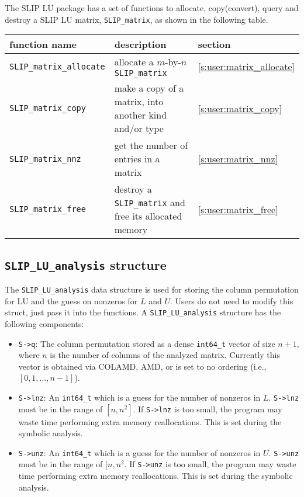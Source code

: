 \documentclass[12pt]{article}
\theoremstyle{definition}
\begin{document}
The SLIP LU package has a set of functions to allocate, copy(convert), query and
destroy a SLIP LU matrix, \verb|SLIP_matrix|, as shown in the following table.

{\small
\begin{center}
\begin{tabular}{lp{2.5in}l}
\hline
function name & description & section \\
\hline
\verb|SLIP_matrix_allocate|
    & allocate a $m$-by-$n$ \verb|SLIP_matrix|
    & \ref{s:user:matrix_allocate} \\
\hline
\verb|SLIP_matrix_copy|
    & make a copy of a matrix, into another kind and/or type
    & \ref{s:user:matrix_copy} \\
\hline
\verb|SLIP_matrix_nnz|
    & get the number of entries in a matrix
    & \ref{s:user:matrix_nnz} \\
\hline
\verb|SLIP_matrix_free|
    & destroy a \verb|SLIP_matrix| and free its allocated memory
    & \ref{s:user:matrix_free} \\
\hline
\end{tabular}
\end{center}
}


\cprotect\subsection{\verb|SLIP_LU_analysis| structure}
\label{ss:SLIP_LU_analysis}

The \verb|SLIP_LU_analysis| data structure is used for storing the column
permutation for LU and the guess on nonzeros for $L$ and $U$. Users do not need
to modify this struct, just pass it into the functions. A
\verb|SLIP_LU_analysis| structure has the following components:

\begin{itemize}
\item \verb|S->q|: The column permutation stored as a dense \verb|int64_t|
vector of size $n+1$, where $n$ is the number of columns of the analyzed matrix.
Currently this vector is obtained via COLAMD, AMD, or is set to no ordering
(i.e., $[0, 1, \hdots, n-1]$).

\item \verb|S->lnz|: An \verb|int64_t| which is a guess for the number of
nonzeros in $L$. \verb|S->lnz| must be in the range of $[n, n^2]$. If
\verb|S->lnz| is too small, the program may waste time performing extra memory
reallocations. This is set during the symbolic analysis.

\item \verb|S->unz|: An \verb|int64_t| which is a guess for the number of
nonzeros in $U$. \verb|S->unz| must be in the range of $[n, n^2$. If
\verb|S->unz| is too small, the program may waste time performing extra memory
reallocations. This is set during the symbolic analysis.
\end{itemize}
\end{document}
